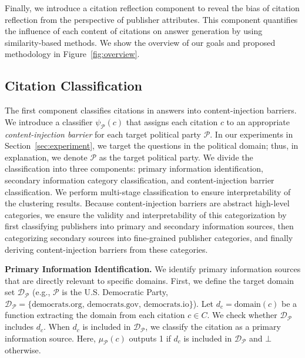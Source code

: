 Finally, we introduce a citation reflection component to reveal the bias of citation reflection from the perspective of publisher attributes.
This component quantifies the influence of each content of citations on answer generation by using similarity-based methods.
We show the overview of our goals and proposed methodology in Figure~\ref{fig:overview}.

\subsection{Citation Classification}
\label{subsec:citation_classification}
The first component classifies citations in answers into content-injection barriers.
We introduce a classifier \( \psi_{\mathcal{P}}(c) \) that assigns each citation \( c \) to an appropriate \emph{content-injection barrier} for each target political party \( \mathcal{P} \).
In our experiments in Section~\ref{sec:experiment}, we target the questions in the political domain; thus, in explanation, we denote \( \mathcal{P} \) as the target political party.
We divide the classification into three components: primary information identification, secondary information category classification, and content-injection barrier classification.
We perform multi-stage classification to ensure interpretability of the clustering results.
Because content-injection barriers are abstract high-level categories, we ensure the validity and interpretability of this categorization by first classifying publishers into primary and secondary information sources, then categorizing secondary sources into fine-grained publisher categories, and finally deriving content-injection barriers from these categories.

\textbf{Primary Information Identification.}
We identify primary information sources that are directly relevant to specific domains.
First, we define the target domain set \( \mathcal{D}_{\mathcal{P}} \) (e.g., $\mathcal{P}$ is the U.S. Democratic Party, \( \mathcal{D}_{\mathcal{P}} = \{\text{democrats.org, democrats.gov, democrats.io}\} \)).
Let \( d_c = \text{domain}(c) \) be a function extracting the domain from each citation \( c \in C \).
We check whether \( \mathcal{D}_{\mathcal{P}} \) includes \( d_c \).
When \( d_c \) is included in \( \mathcal{D}_{\mathcal{P}} \), we classify the citation as a primary information source.
Here, \( \mu_{\mathcal{P}}(c) \) outputs 1 if \( d_c \) is included in \( \mathcal{D}_{\mathcal{P}} \) and \(\bot\) otherwise.


